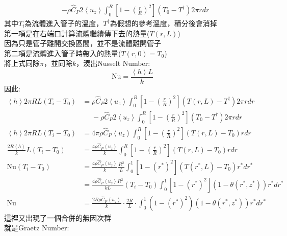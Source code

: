 \documentclass[../main.tex]{subfiles}
\begin{document}
\begin{itemize}
\begin{enumerate}
\begin{align}
      &-\rho \hat C_P 2\left<u_z\right> \int_0^R\left[
        1 - \left(\frac{r}{R}\right)^2
      \right](T_0 - T^\dagger)2\pi r dr
    \end{align}
    其中$T_i$為流體進入管子的溫度，$T^\dagger$為假想的參考溫度，積分後會消掉\\
    第一項是在右端口計算流體繼續傳下去的熱量($T(r,L)$)\\
    因為只是管子離開交換區間，並不是流體離開管子\\
    第二項是流體進入管子時帶入的熱量($T(r,0)=T_0$)\\
    將上式同除$\pi$，並同除$k$，湊出Nusselt Number:
    \begin{equation}
      \boxed{\text{Nu} = \frac{\left<h\right>L}{k}} \label{eq:graetz_nusselt_number}
    \end{equation}
    因此:
    \begin{align}
      \left<h\right> 2\pi RL (T_i - T_0) &=\rho \hat C_P 2\left<u_z\right> \int_0^R\left[
        1 - \left(\frac{r}{R}\right)^2
      \right]\left(T(r,L)-T^\dagger \right)2\pi r dr \nonumber\\
      &\phantom{=} -\rho \hat C_P 2\left<u_z\right> \int_0^R\left[
        1 - \left(\frac{r}{R}\right)^2
      \right](T_0 - T^\dagger)2\pi r dr \nonumber\\
      \left<h\right> 2\pi RL (T_i - T_0) &=4\pi\rho \hat C_P \left<u_z\right> \int_0^R\left[
        1 - \left(\frac{r}{R}\right)^2
      \right]\left(T(r,L)-T_0\right) r dr \nonumber\\
      \frac{2R\left<h\right>}{k}L (T_i - T_0) &=\frac{4\rho \hat C_P\left<u_z\right>}{k} \int_0^R\left[
        1 - \left(\frac{r}{R}\right)^2
      \right]\left(T(r,L)-T_0\right) r dr \nonumber\\
      \text{Nu} (T_i - T_0) &= \frac{4\rho \hat C_P\left<u_z\right>}{k}\frac{R^2}{L}\int_0^1\left[
        1 - (r^\ast)^2
      \right]\left(T(r^\ast,L)-T_0\right) r^\ast dr^\ast \nonumber\\
      &= \frac{4\rho \hat C_P\left<u_z\right> R^2}{k L} (T_i - T_0) \int_0^1\left[
        1 - (r^\ast)^2
      \right]\left(1-\theta(r^\ast, z^\ast) \right) r^\ast dr^\ast \nonumber\\
      \text{Nu} &= \frac{2 R\rho \hat C_P\left<u_z\right>}{k} \cdot \frac{2R}{L}\cdot
      \int_0^1\left(
        1 - (r^\ast)^2
      \right)\left(1-\theta(r^\ast, z^\ast) \right) r^\ast dr^\ast
    \end{align}
    這裡又出現了一個合併的無因次群\\
    就是Graetz Number:

\end{enumerate}
\end{itemize}
\end{document}
